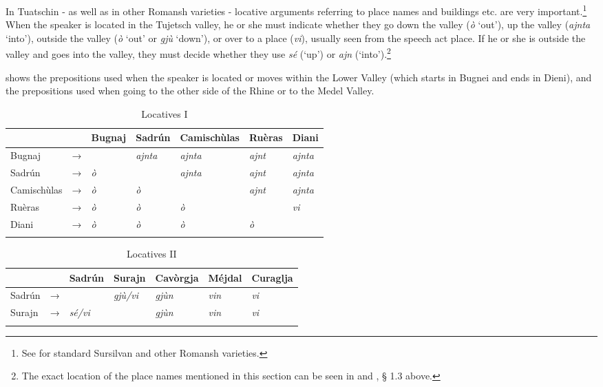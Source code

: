 In Tuatschin - as well as in other Romansh varieties - locative arguments referring to place names and buildings etc. are very important.\footnote{See \citet[4-126]{Ebneter1994} for standard Sursilvan and other Romansh varieties.} When the speaker is located in the Tujetsch valley, he or she must indicate whether they go down the valley (\textit{ò} `out'), up the valley (\textit{ajnta} `into'), outside the valley (\textit{ò} `out' or \textit{gjù} `down'), or over to a place (\textit{vi}), usually seen from the speech act place. If he or she is outside the valley and goes into the valley, they must decide whether they use \textit{sé} (`up') or \textit{ajn} (`into').\footnote{The exact location of the place names mentioned in this section can be seen in  and , § 1.3 above.}

 shows the prepositions used when the speaker is located or moves within the Lower Valley (which starts in Bugnei and ends in Dieni), and  the prepositions used when going to the other side of the Rhine or to the Medel Valley.

\begin{table}
	\caption{Locatives I}
	\label{loc1}
	\begin{tabular}{lllllll}
		\lsptoprule
		& & Bugnaj & Sadrún & Camischùlas & Ruèras & Diani \\
		\midrule
		Bugnaj  & →& \longrule  & \textit{ajnta} & \textit{ajnta} & \textit{ajnt} & \textit{ajnta}\\
		Sadrún & → & \textit{ò}  & \longrule & \textit{ajnta} & \textit{ajnt} & \textit{ajnta}\\
		Camischùlas & →& \textit{ò} & \textit{ò} & \longrule & \textit{ajnt} & \textit{ajnta}\\
		Ruèras & →& \textit{ò} & \textit{ò} & \textit{ò} & \longrule & \textit{vi}\\
		Diani & →& \textit{ò} & \textit{ò} & \textit{ò} & \textit{ò} & \longrule\\
		\lspbottomrule
	\end{tabular}
\end{table}

\begin{table}
	\caption{Locatives II}
	\label{loc2}
	\begin{tabular}{lllllll}
		\lsptoprule
		& & Sadrún & Surajn & Cavòrgja & Méjdal & Curaglja\\ 
		\midrule
		Sadrún  &    →& \longrule & \textit{gjù/vi}  & \textit{gjùn}    & \textit{vin} & \textit{vi}\\
		Surajn  &   → &  \textit{sé/vi} & \longrule & \textit{gjùn}    & \textit{vin} & \textit{vi}   \\
		\lspbottomrule
	\end{tabular}
\end{table}

